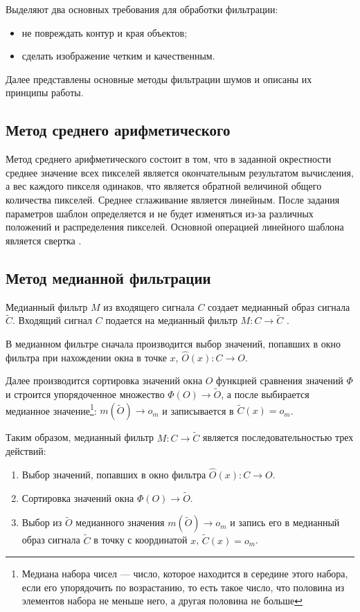 Выделяют два основных требования для обработки фильтрации:
\begin{itemize}
	\item не повреждать контур и края объектов;
	\item сделать изображение четким и качественным.
\end{itemize}

Далее представлены основные методы фильтрации шумов и описаны их принципы работы.
 


\subsection{Метод среднего арифметического}

Метод среднего арифметического состоит в том, что в заданной окрестности среднее значение всех пикселей является окончательным результатом вычисления, а вес каждого пикселя одинаков, что является обратной величиной общего количества пикселей. Среднее сглаживание является линейным. После задания параметров шаблон определяется и не будет изменяться из-за различных положений и распределения пикселей. Основной операцией линейного шаблона является свертка \cite{meanfilter}.


\subsection{Метод медианной фильтрации}

Медианный фильтр $M$ из входящего сигнала $C$ создает медианный образ сигнала $\widetilde{C}$.
Входящий сигнал $C$ подается на медианный фильтр $M:C \rightarrow \widetilde{C}$ \cite{medianfilter}.

В медианном фильтре сначала производится выбор значений, попавших в окно фильтра при нахождении окна в точке $x$, $\hat{O}(x):C \rightarrow O$.

Далее производится сортировка значений окна $O$ функцией сравнения значений $\Phi$ и строится упорядоченное множество $\Phi(O) \rightarrow \widetilde{O}$, а после выбирается медианное значение\footnote{Медиана набора чисел --- число, которое находится в середине этого набора, если его упорядочить по возрастанию, то есть такое число, что половина из элементов набора не меньше него, а другая половина не больше}: $m(\widetilde{O}) \rightarrow o_{m}$ и записывается в $\widetilde{C}(x)= o_{m}$.

Таким образом, медианный фильтр $M:C \rightarrow \widetilde{C}$ является последовательностью трех действий:
\begin{enumerate}
	\item Выбор значений, попавших в окно фильтра $\hat{O}(x):C \rightarrow O$.
	\item Сортировка значений окна $\Phi(O) \rightarrow \widetilde{O}$.
	\item Выбор из $\widetilde{O}$ медианного значения $m(\widetilde{O}) \rightarrow o_{m}$ и запись его в медианный образ сигнала $\widetilde{C}$ в точку с координатой $x$, $\widetilde{C}(x) = o_{m} $.
\end{enumerate}

